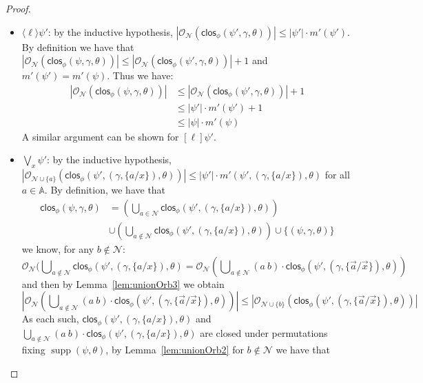 \documentclass[10pt,a4paper]{article}
\theoremstyle{definition}
\theoremstyle{remark}
\DeclareMathOperator{\supp}{supp}
\newcommand\diam[1]{\langle#1\rangle}
\newcommand\sq[1]{[#1]}
\newcommand\Ncal{\mathcal{N}}
\newcommand\Atoms{\mathbb{A}}
\newcommand\orb[1][]{\mathcal{O}_{#1}}
\newcommand{\clos}[0]{\mathsf{clos}}
\begin{document}
\begin{proof}
\begin{enumerate}
\begin{itemize}
			As, for $i \in \{1,2\}$, $\|\psi_i\| \le \|\psi\|$ we have $m'(\psi_i) \le m'(\psi)$. 
			Thus we have:
			\begin{align*}
				|\orb[\Ncal](\clos_\phi(\psi_1 \lor \psi_2,\gamma, \theta))| &\le |\orb[\Ncal](\clos_\phi(\psi_1, \gamma, \theta))| + |\orb[\Ncal](\clos_\phi(\psi_2,\gamma, \theta))| 
				\\&\le (|\psi_1|\cdot m'(\psi_1)) + (|\psi_2|\cdot m'(\psi_2)) \le |\psi|\cdot m(\psi)
			\end{align*}			A similar argument can be shown for $\psi_1 \land \psi_2$.
						\item $\diam{\ell}\psi'$: by the inductive hypothesis, $|\orb[\Ncal](\clos_\phi(\psi', \gamma, \theta))| \le |\psi'|\cdot m'(\psi')$.
			By definition
			we have that $|\orb[\Ncal](\clos_\phi(\psi, \gamma, \theta))| \le |\orb[\Ncal](\clos_\phi(\psi',\gamma,\theta))| + 1$ and $m'(\psi') = m'(\psi)$.
						Thus we have:
			\begin{align*}
				|\orb[\Ncal](\clos_\phi(\psi,\gamma,\theta))| &\le |\orb[\Ncal](\clos_\phi(\psi',\gamma,\theta))| + 1
				\\&\le |\psi'|\cdot m'(\psi') + 1 
				\\&\le |\psi|\cdot m'(\psi)
			\end{align*}
			A similar argument can be shown for $\sq{\ell}\psi'$.
						\item $\bigvee_x \psi'$: by the inductive hypothesis, $|\orb[\Ncal \cup \{a\}](\clos_\phi(\psi',(\gamma, \{a/x\}), \theta))| \le |\psi'|\cdot m'(\psi',(\gamma, \{a/x\}),\theta)$ for all $a \in \Atoms$.
			By definition, we have that 
						\begin{align*}
				\clos_\phi(\psi,\gamma, \theta) &= (\bigcup\nolimits_{a \in \Ncal} \clos_\phi(\psi',(\gamma, \{a/x\}), \theta))\\ &\cup (\bigcup\nolimits_{a \notin \Ncal} \clos_\phi(\psi',(\gamma, \{a/x\}), \theta)) \cup \{(\psi,\gamma, \theta)\}
			\end{align*}
			we know, for any $b \notin \Ncal$:
						\[
			\orb[\Ncal](\bigcup\nolimits_{a \notin \Ncal} \clos_\phi(\psi',(\gamma, \{a/x\}), \theta) = \orb[\Ncal](\bigcup\nolimits_{a \notin \Ncal} (a\ b) \cdot \clos_\phi(\psi',(\gamma, \{\vec a / \vec x\}), \theta))
			\]
						and then by Lemma~\ref{lem:unionOrb3} we obtain 
			\[
			|\orb[\Ncal](\bigcup\nolimits_{a \notin \Ncal} (a\ b) \cdot \clos_\phi(\psi',(\gamma, \{\vec a / \vec x\}), \theta))| \le |\orb[\Ncal \cup \{b\}](\clos_\phi(\psi',(\gamma, \{\vec a / \vec x\}), \theta))|
			\]
			As each such, $\clos_\phi(\psi',(\gamma, \{a/x\}), \theta)$ and $\bigcup\nolimits_{a \notin \Ncal} (a\ b) \cdot\clos_\phi(\psi',(\gamma, \{ a /  x\}), \theta)$ are closed under permutations fixing $\supp(\psi,\theta)$, by Lemma~\ref{lem:unionOrb2} for $b \notin \Ncal$ we have that 

\end{itemize}
\end{enumerate}
\end{proof}
\end{document}
